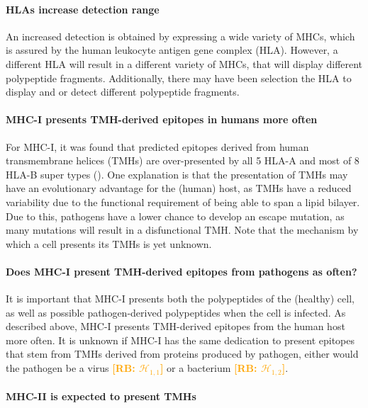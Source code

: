 \documentclass{article}
\newcommand{\richel}[1]{\textcolor{orange}{\textbf{[RB: #1]}}}
\begin{document}
\paragraph{HLAs increase detection range}

An increased detection
is obtained by expressing a wide variety of
MHCs, which is assured by the human leukocyte antigen gene complex (HLA).
However, a different HLA will result in a different variety of MHCs,
that will display different polypeptide fragments. Additionally, there
may have been selection the HLA to display and or detect different
polypeptide fragments.

\paragraph{MHC-I presents TMH-derived epitopes in humans more often}

For MHC-I, it was found that predicted epitopes derived 
from human transmembrane helices (TMHs)
are over-presented by all 5 HLA-A and 
most of 8 HLA-B super types (\cite{bianchi2017}).
One explanation is that the presentation of TMHs 
may have an evolutionary advantage for 
the (human) host, as TMHs have a reduced variability 
due to the functional requirement of being able to span a lipid bilayer. 
Due to this, pathogens have a lower chance to develop an escape mutation,
as many mutations will result in a disfunctional TMH.
Note that the mechanism by which a cell presents its TMHs is
yet unknown.

\paragraph{Does MHC-I present TMH-derived epitopes from pathogens as often?}

It is important that MHC-I presents both the polypeptides of the 
(healthy) cell, as well as possible pathogen-derived polypeptides when the
cell is infected. As described above, MHC-I presents TMH-derived epitopes 
from the human host more often. It is unknown if MHC-I has the same
dedication to present epitopes that stem from TMHs derived from
proteins produced by pathogen, either would the pathogen
be a virus \richel{$\mathcal{H}_{1,1}$} or 
a bacterium \richel{$\mathcal{H}_{1,2}$}.


\paragraph{MHC-II is expected to present TMHs}
\end{document}

